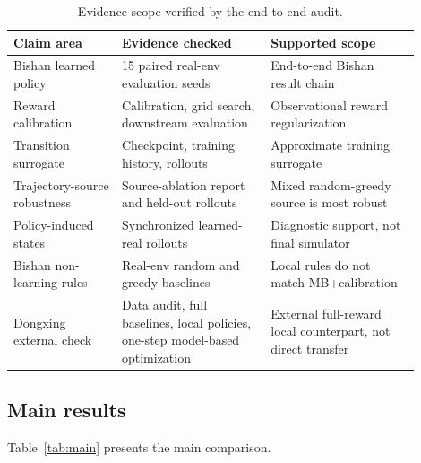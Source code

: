 \documentclass[11pt]{article}
\begin{document}
\begin{table}[htbp]
\centering
\footnotesize
\setlength{\tabcolsep}{3pt}
\caption{Evidence scope verified by the end-to-end audit.}
\label{tab:e2e_scope}
\begin{tabular}{p{0.24\linewidth}p{0.33\linewidth}p{0.33\linewidth}}
\toprule
Claim area & Evidence checked & Supported scope \\
\midrule
Bishan learned policy & 15 paired real-env evaluation seeds & End-to-end Bishan result chain \\
Reward calibration & Calibration, grid search, downstream evaluation & Observational reward regularization \\
Transition surrogate & Checkpoint, training history, rollouts & Approximate training surrogate \\
Trajectory-source robustness & Source-ablation report and held-out rollouts & Mixed random-greedy source is most robust \\
Policy-induced states & Synchronized learned-real rollouts & Diagnostic support, not final simulator \\
Bishan non-learning rules & Real-env random and greedy baselines & Local rules do not match MB+calibration \\
Dongxing external check & Data audit, full baselines, local policies, one-step model-based optimization & External full-reward local counterpart, not direct transfer \\
\bottomrule
\end{tabular}
\end{table}

\subsection{Main results}

Table~\ref{tab:main} presents the main comparison.
\end{document}
